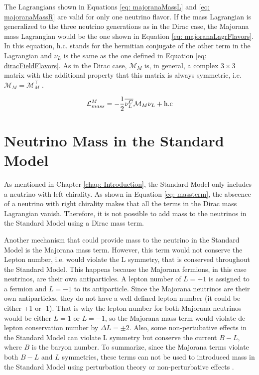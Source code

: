 The Lagrangians shown in Equations \ref{eq: majoranaMassL} and \ref{eq: majoranaMassR} are valid for only one neutrino flavor. If the mass Lagrangian is generalized to the three neutrino generations as in the Dirac case, the Majorana mass Lagrangian would be the one shown in Equation \ref{eq: majoranaLagrFlavors}. In this equation, h.c. stands for the hermitian conjugate of the other term in the Lagrangian and $\nu_{L}$ is the same as the one defined in Equation \ref{eq: diracFieldFlavors}. As in the Dirac case, $\mathcal{M}_{M}$ is, in general, a complex $3 \times 3$ matrix with the additional property that this matrix is always symmetric, i.e. $\mathcal{M}_{M} = \mathcal{M}_{M}^{\intercal}$ \cite{NeutrinoMass}. 

\begin{equation}\label{eq: majoranaLagrFlavors}
\mathcal{L}_{mass}^{M} = -\frac{1}{2}\overline{\nu_{L}^{C}}\mathcal{M}_{M}\nu_{L} + \text{h.c}
\end{equation}


\section{Neutrino Mass in the Standard Model}

As mentioned in Chapter \ref{chap: Introduction}, the Standard Model only includes a neutrino with left chirality. As shown in Equation \ref{eq: massterm}, the abscence of a neutrino with right chirality makes that all the terms in the Dirac mass Lagrangian vanish. Therefore, it is not possible to add mass to the neutrinos in the Standard Model using a Dirac mass term.

Another mechanism that could provide mass to the neutrino in the Standard Model is the Majorana mass term. However, this term would not conserve the Lepton number, i.e. would violate the L symmetry, that is conserved throughout the Standard Model\cite{NeutrinoMass2}. This happens because the Majorana fermions, in this case neutrinos, are their own antiparticles. A lepton number of $L = +1$ is assigned to a fermion and $L = -1$ to its antiparticle. Since the Majorana neutrinos are their own antiparticles, they do not have a well defined lepton number (it could be either +1 or -1). That is why the lepton number for both Majorana neutrinos would be either $L = 1$ or $L = -1$, so the Majorana mass term would violate de lepton conservation number by $\Delta L = \pm 2$. Also, some non-pertubative effects in the Standard Model can violate L symmetry but conserve the current $B - L$, where $B$ is the baryon number. To summarize, since the Majorana terms violate both $B-L$ and $L$ symmetries, these terms can not be used to introduced mass in the Standard Model using perturbation theory or non-perturbative effects \cite{NeutrinoMass2}.  

